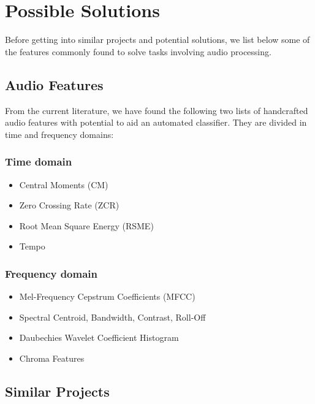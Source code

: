 \section{Possible Solutions}

Before getting into similar projects and potential solutions, we list below some of the features commonly found to solve tasks involving audio processing.

\subsection{Audio Features}

From the current literature, we have found the following two lists of handcrafted audio features with potential to aid an automated classifier. They are divided in time and frequency domains:


\subsubsection{Time domain}

\begin{itemize}
    \item Central Moments (CM)
    \item Zero Crossing Rate (ZCR) \cite{Li2006}
    \item Root Mean Square Energy (RSME) \cite{Tao}
    \item Tempo
\end{itemize}

\subsubsection{Frequency domain}

\begin{itemize}
    \item Mel-Frequency Cepstrum Coefficients (MFCC) \cite{Li2006, Nanni2016, Hoffmann2016, Lim2012}
    \item Spectral Centroid, Bandwidth, Contrast, Roll-Off \cite{Li2006, Li2005}
    \item Daubechies Wavelet Coefficient Histogram \cite{Li2006}
    \item Chroma Features
\end{itemize}

\subsection{Similar Projects}

